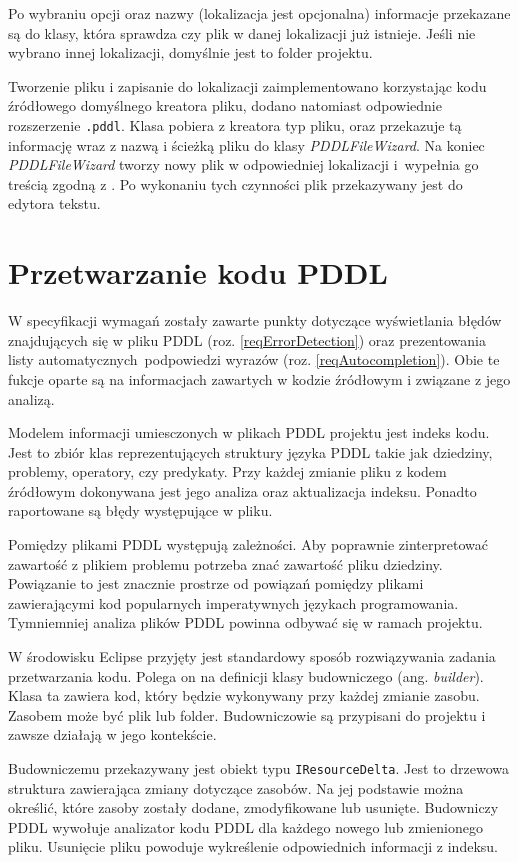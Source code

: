 Po wybraniu opcji oraz nazwy (lokalizacja jest opcjonalna) informacje przekazane są do klasy, która sprawdza czy plik w danej lokalizacji już istnieje. Jeśli nie wybrano innej lokalizacji, domyślnie jest to folder projektu.
 
Tworzenie pliku i zapisanie do lokalizacji zaimplementowano korzystając kodu źródłowego domyślnego kreatora pliku, dodano natomiast odpowiednie rozszerzenie \texttt{.pddl}. Klasa pobiera z kreatora typ pliku, oraz przekazuje tą informację wraz z nazwą i ścieżką pliku do klasy \emph{PDDLFileWizard}. Na koniec \emph{PDDLFileWizard} tworzy nowy plik w odpowiedniej lokalizacji i~wypełnia go treścią zgodną z . Po wykonaniu tych czynności plik przekazywany jest do edytora tekstu.

\section{Przetwarzanie kodu PDDL}
W specyfikacji wymagań zostały zawarte punkty dotyczące wyświetlania błędów znajdujących 
się w pliku PDDL (roz. \ref{reqErrorDetection}) oraz prezentowania listy automatycznych\
podpowiedzi wyrazów (roz. \ref{reqAutocompletion}).
Obie te fukcje oparte są na informacjach zawartych w kodzie źródłowym i związane
z jego analizą.

Modelem informacji umiesczonych w plikach PDDL projektu jest indeks kodu. Jest to
zbiór klas reprezentujących struktury języka PDDL takie jak dziedziny, problemy, operatory, czy predykaty.
Przy każdej zmianie pliku z kodem źródłowym dokonywana jest jego analiza oraz
aktualizacja indeksu. Ponadto raportowane są błędy występujące w pliku.

Pomiędzy plikami PDDL występują zależności. Aby poprawnie zinterpretować zawartość z plikiem
problemu potrzeba znać zawartość pliku dziedziny. Powiązanie to jest znacznie prostrze od 
powiązań pomiędzy plikami zawierającymi kod popularnych imperatywnych językach programowania.
Tymniemniej analiza plików PDDL powinna odbywać się w ramach projektu.

W środowisku Eclipse przyjęty jest standardowy sposób rozwiązywania zadania przetwarzania
kodu. Polega on na definicji klasy budowniczego (ang. \emph{builder}). Klasa ta
zawiera kod, który będzie wykonywany przy każdej zmianie zasobu. Zasobem
może być plik lub folder. Budowniczowie
są przypisani do projektu i zawsze działają w jego kontekście.

Budowniczemu przekazywany jest obiekt typu \texttt{IResourceDelta}. Jest to drzewowa
struktura zawierająca zmiany dotyczące zasobów. Na jej podstawie można określić, 
które zasoby zostały dodane, zmodyfikowane lub usunięte. Budowniczy PDDL wywołuje analizator
kodu PDDL dla każdego nowego lub zmienionego pliku. Usunięcie pliku powoduje wykreślenie
odpowiednich informacji z indeksu.

